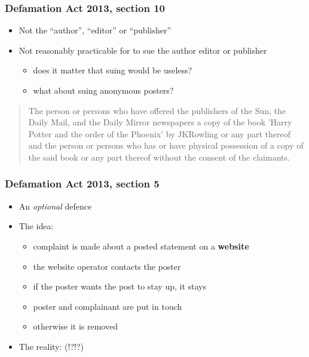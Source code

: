 \documentclass[ignorenonframetext,]{beamer}
\begin{document}
\begin{frame}
  \frametitle{Defamation Act 2013, section 10}
  \begin{itemize}
  \item Not the ``author'', ``editor'' or ``publisher''
  \item Not reasonably practicable for to sue the author editor or publisher
    \begin{itemize}
    \item does it matter that suing would be useless?
    \item what about suing anonymous posters?
    \end{itemize}
  \end{itemize}
\end{frame}

\begin{frame}
  \begin{quote}
     The person or persons who have offered the publishers of the Sun, the Daily Mail, and the Daily Mirror newspapers a copy of the book 'Harry Potter and the order of the Phoenix' by JKRowling or any part thereof and the person or persons who has or have physical possession of a copy of the said book or any part thereof without the consent of the claimants.
  \end{quote}
\end{frame}

\begin{frame}
  \frametitle{Defamation Act 2013, section 5}
  \begin{itemize}
  \item An {\it optional} defence
  \item The idea:
    \begin{itemize}
    \item complaint is made about a posted statement on a {\bf website}
    \item the website operator contacts the poster
    \item if the poster wants the post to stay up, it stays
    \item poster and complainant are put in touch
    \item otherwise it is removed
    \end{itemize}
  \item The reality: (!?!?)
  \end{itemize}
\end{frame}
\end{document}

